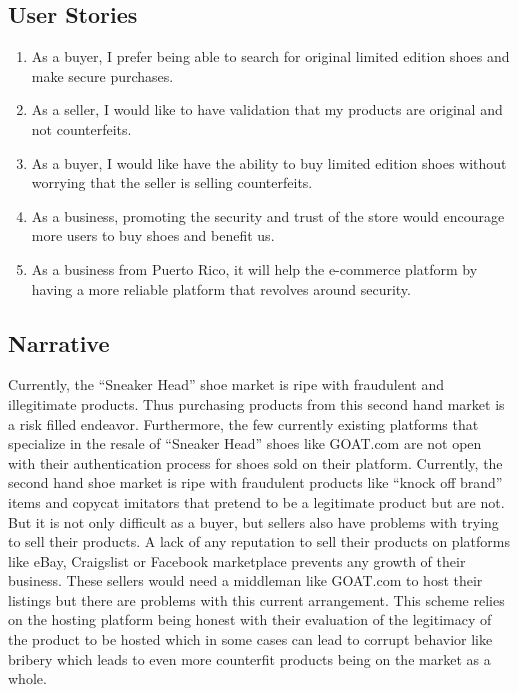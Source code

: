 \subsection{User Stories}
\begin{enumerate}
  \item As a buyer, I prefer being able to search for original limited edition shoes and make secure purchases.
  \item As a seller, I would like to have validation that my products are original and not counterfeits.
  \item As a buyer, I would like have the ability to buy limited edition shoes without worrying that the seller is selling counterfeits.
  \item As a business, promoting the security and trust of the store would encourage more users to buy shoes and benefit us.
  \item As a business from Puerto Rico, it will help the e-commerce platform by having a more reliable platform that revolves around security.
\end{enumerate}
\subsection{Narrative}
\hspace{1cm} Currently, the ``Sneaker Head'' shoe market is ripe with fraudulent and illegitimate products. Thus purchasing products from this second hand market is a risk filled endeavor. Furthermore, the few currently existing platforms that specialize in the resale of ``Sneaker Head'' shoes like GOAT.com are not open with their authentication process for shoes sold on their platform. Currently, the second hand shoe market is ripe with fraudulent products like ``knock off brand'' items and copycat imitators that pretend to be a legitimate product but are not. But it is not only difficult as a buyer, but sellers also have problems with trying to sell their products. A lack of any reputation to sell their products on platforms like eBay, Craigslist or Facebook marketplace prevents any growth of their business. These sellers would need a middleman like GOAT.com to host their listings but there are problems with this current arrangement. This scheme relies on the hosting platform being honest with their evaluation of the legitimacy of the product to be hosted which in some cases can lead to corrupt behavior like bribery which leads to even more counterfit products being on the market as a whole.
